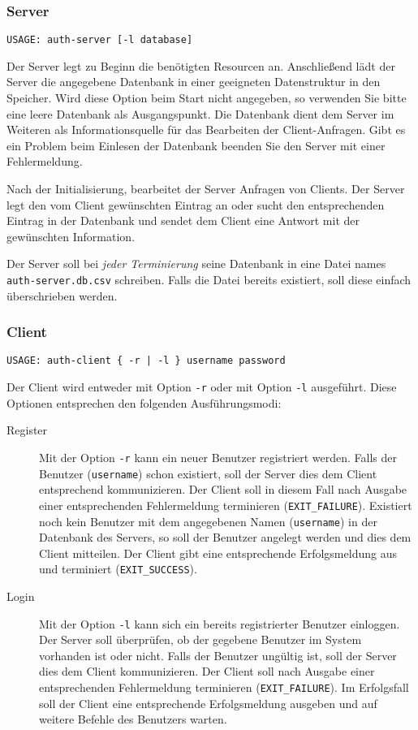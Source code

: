 \subsubsection*{Server}
\begin{verbatim}
USAGE: auth-server [-l database]
\end{verbatim}

Der Server legt zu Beginn die benötigten Resourcen an. Anschließend lädt der
Server die angegebene Datenbank in einer geeigneten Datenstruktur in den
Speicher. Wird diese Option beim Start nicht angegeben, so verwenden Sie bitte
eine leere Datenbank als Ausgangspunkt. Die Datenbank dient dem Server im
Weiteren als Informationsquelle für das Bearbeiten der Client-Anfragen. Gibt es
ein Problem beim Einlesen der Datenbank beenden Sie den Server mit einer
Fehlermeldung.

Nach der Initialisierung, bearbeitet der Server Anfragen von Clients. Der
Server legt den vom Client gewünschten Eintrag an oder sucht den entsprechenden
Eintrag in der Datenbank und sendet dem Client eine Antwort mit der gewünschten
Information.

Der Server soll bei \textit{jeder Terminierung} seine Datenbank in eine Datei
names \texttt{auth-server.db.csv} schreiben. Falls die Datei bereits existiert,
soll diese einfach überschrieben werden.

\subsubsection*{Client}
\begin{verbatim}
USAGE: auth-client { -r | -l } username password
\end{verbatim}

Der Client wird entweder mit Option \texttt{-r} oder mit Option \texttt{-l}
ausgeführt. Diese Optionen entsprechen den folgenden Ausführungsmodi:

\begin{description}
  \item[Register] Mit der Option \texttt{-r} kann ein neuer Benutzer
    registriert werden. Falls der Benutzer (\texttt{username}) schon existiert,
    soll der Server dies dem Client entsprechend kommunizieren. Der Client soll
    in diesem Fall nach Ausgabe einer entsprechenden Fehlermeldung terminieren
    (\texttt{EXIT\_FAILURE}).  Existiert noch kein Benutzer mit dem angegebenen
    Namen (\texttt{username}) in der Datenbank des Servers, so soll der
    Benutzer angelegt werden und dies dem Client mitteilen. Der Client gibt
    eine entsprechende Erfolgsmeldung aus und terminiert
    (\texttt{EXIT\_SUCCESS}).
  \item[Login] Mit der Option \texttt{-l} kann sich ein
    bereits registrierter Benutzer einloggen. Der Server soll überprüfen, ob
    der gegebene Benutzer im System vorhanden ist oder nicht. Falls der
    Benutzer ungültig ist, soll der Server dies dem Client kommunizieren. Der
    Client soll nach Ausgabe einer entsprechenden Fehlermeldung terminieren
    (\texttt{EXIT\_FAILURE}).  Im Erfolgsfall soll der Client eine
    entsprechende Erfolgsmeldung ausgeben und auf weitere Befehle des Benutzers
    warten.
\end{description}


